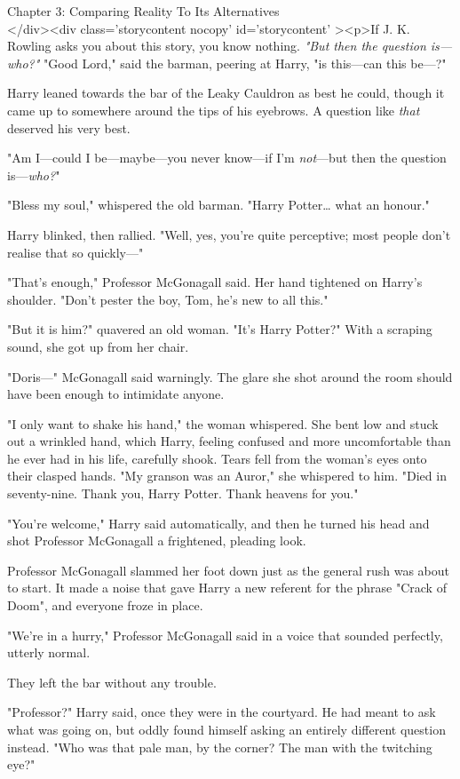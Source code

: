 
Chapter 3: Comparing Reality To Its Alternatives\\
</div><div  class='storycontent nocopy' id='storycontent' ><p>If J. K. Rowling 
asks you about this story, you know nothing.
\sbreak
\emph{"But then the question is---who?"}
\sbreak
"Good Lord," said the barman, peering at Harry, "is this---can this be---?"

Harry leaned towards the bar of the Leaky Cauldron as best he could, though it 
came up to somewhere around the tips of his eyebrows. A question like 
\emph{that} deserved his very best.

"Am I---could I be---maybe---you never know---if I'm\emph{ not}---but then the 
question is---\emph{who?}"

"Bless my soul," whispered the old barman. "Harry Potter{\ldots} what an 
honour."

Harry blinked, then rallied. "Well, yes, you're quite perceptive; most people 
don't realise that so quickly---"

"That's enough," Professor McGonagall said. Her hand tightened on Harry's 
shoulder. "Don't pester the boy, Tom, he's new to all this."

"But it is him?" quavered an old woman. "It's Harry Potter?" With a scraping 
sound, she got up from her chair.

"Doris---" McGonagall said warningly. The glare she shot around the room should 
have been enough to intimidate anyone.

"I only want to shake his hand," the woman whispered. She bent low and stuck 
out a wrinkled hand, which Harry, feeling confused and more uncomfortable than 
he ever had in his life, carefully shook. Tears fell from the woman's eyes onto 
their clasped hands. "My granson was an Auror," she whispered to him. "Died in 
seventy-nine. Thank you, Harry Potter. Thank heavens for you."

"You're welcome," Harry said automatically, and then he turned his head and 
shot Professor McGonagall a frightened, pleading look.

Professor McGonagall slammed her foot down just as the general rush was about 
to start. It made a noise that gave Harry a new referent for the phrase "Crack 
of Doom", and everyone froze in place.

"We're in a hurry," Professor McGonagall said in a voice that sounded 
perfectly, utterly normal.

They left the bar without any trouble.

"Professor?" Harry said, once they were in the courtyard. He had meant to ask 
what was going on, but oddly found himself asking an entirely different 
question instead. "Who was that pale man, by the corner? The man with the 
twitching eye?"

